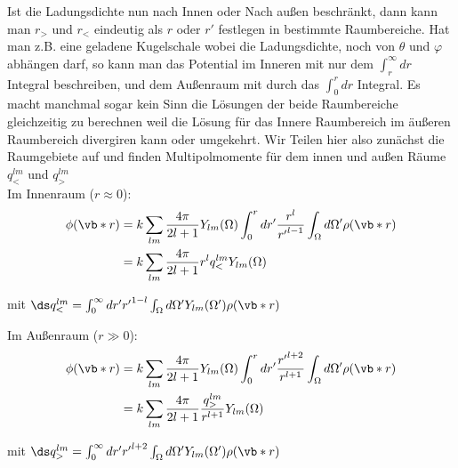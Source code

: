 Ist die Ladungsdichte nun nach Innen oder Nach außen beschränkt, dann kann
man $r_>$ und $r_<$ eindeutig als $r$ oder $r'$ festlegen in bestimmte 
Raumbereiche. Hat man z.B. eine geladene Kugelschale wobei die 
Ladungsdichte, noch von $\theta$ und $\varphi$ abhängen darf, so kann man
das Potential im Inneren mit nur dem $\int_r^\infty dr$ Integral beschreiben, und
dem Außenraum mit durch das $\int_0^r dr$ Integral. Es macht manchmal 
sogar kein Sinn die Lösungen der beide Raumbereiche gleichzeitig zu 
berechnen weil die Lösung für das Innere Raumbereich im äußeren Raumbereich
divergiren kann oder umgekehrt. Wir Teilen hier also zunächst die 
Raumgebiete auf und finden Multipolmomente für dem innen und außen Räume 
$q_<^{lm}$ und $q_>^{lm}$\\

\noindent
Im Innenraum ($r\approx 0$):
\begin{equation}
  \begin{split}
    \phi(\vb*r) 
    &= k\sum_{lm} \frac{4\pi}{2l+1} Y_{lm}(\Omega)
    \int_0^{r} dr'\frac{{r}^{l}}{{r'}^{l-1}}
    \int_\Omega d\Omega'\rho(\vb*r)\\
    &= k\sum_{lm} \frac{4\pi}{2l+1}r^l q_<^{lm} Y_{lm}(\Omega) 
  \end{split}
\end{equation}
\begin{center}
  mit $\ds q_<^{lm}=\int_0^\infty dr' {r'}^{1-l}
  \int_\Omega d\Omega' Y_{lm}(\Omega')\rho(\vb*r)$
\end{center}
\noindent
Im Außenraum ($r\gg0$):
\begin{equation}
  \begin{split}
    \phi(\vb*r) 
    &= k\sum_{lm} \frac{4\pi}{2l+1} Y_{lm}(\Omega)
    \int_0^{r} dr'\frac{{r'}^{l+2}}{r^{l+1}}
    \int_\Omega d\Omega'\rho(\vb*r)\\
    &= k\sum_{lm} \frac{4\pi}{2l+1} 
    \frac{q_>^{lm}}{r^{l+1}} Y_{lm}(\Omega) 
  \end{split}
\end{equation}
\begin{center}
  mit $\ds q_>^{lm}=\int_0^\infty dr' {r'}^{l+2}
  \int_\Omega d\Omega' Y_{lm}(\Omega')\rho(\vb*r)$
\end{center}
